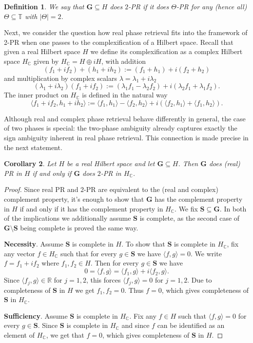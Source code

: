 \documentclass[reqno,a4paper,11pt]{amsart}
\numberwithin{equation}{section}
\newtheorem{definition}{Definition}[section]
\newtheorem{corollary}[definition]{Corollary}
\def\R{{\mathbb R}}
\def\T{{\mathbb T}}
\def\C{{\mathbb C}}
\newcommand\1{\mathds{1}}
\begin{document}
\begin{definition}\label{def:2PR}
    We say that $\mathbf{G}\subseteq H$ does $2$-PR if it does $\Theta$-PR for any (hence all) $\Theta\subseteq \T$ with $|\Theta|=2$.
\end{definition}

Next, we consider the question how real phase retrieval fits into the framework of 2-PR when one passes to the complexification of a Hilbert space. Recall that given a real Hilbert space $H$ we define its complexification as a complex Hilbert space $H_\C$ given by $H_\C = H\oplus iH$, with addition 
$$(f_1 + if_2) + (h_1 + ih_2) := (f_1+h_1) + i(f_2+h_2)$$
and multiplication by complex scalars $\lambda = \lambda_1+i\lambda_2$
$$(\lambda_1+i\lambda_2)(f_1+if_2):=(\lambda_1f_1 - \lambda_2f_2) + i(\lambda_2f_1 + \lambda_1f_2).$$
The inner product on $H_\C$ is defined in the natural way 
$$\langle f_1+if_2,h_1+ih_2\rangle:=\langle f_1,h_1\rangle - \langle f_2,h_2\rangle + i(\langle f_2,h_1\rangle + \langle f_1,h_2\rangle).$$

Although real and complex phase retrieval behave differently in general, the case of two phases is special: the two-phase ambiguity already captures exactly the sign ambiguity inherent in real phase retrieval. This connection is made precise in the next statement.

\begin{corollary}
    Let $H$ be a real Hilbert space and let $\mathbf{G} \subseteq H$. Then $\mathbf{G}$ does (real) PR in $H$ if and only if $\mathbf{G}$ does $2$-PR in $H_\C$.
\end{corollary}
\begin{proof}
    Since real PR and $2$-PR are equivalent to the (real and complex) complement property, it's enough to show that $\mathbf{G}$ has the complement property in $H$ if and only if it has the complement property in $H_\C$. We fix $\mathbf{S}\subseteq \mathbf{G}$. In both of the implications we additionally assume $\mathbf{S}$ is complete, as the second case of $\mathbf{G\setminus S}$ being complete is proved the same way.

    \textbf{Necessity}. Assume $\mathbf{S}$ is complete in $H$. To show that $\mathbf{S}$ is complete in $H_\C$, fix any vector $f\in H_\C$ such that for every $g\in \mathbf{S}$ we have $\langle f,g\rangle=0.$ We write $f=f_1+if_2$ where $f_1,f_2\in H$. Then for every $g\in \mathbf{S}$ we have
    $$0 = \langle f,g\rangle = \langle f_1, g\rangle + i\langle f_2,g\rangle.$$
    Since $\langle f_j,g\rangle \in \R$ for $j=1,2$, this forces $\langle f_j,g\rangle=0$ for $j=1,2$. Due to completeness of $\mathbf{S}$ in $H$ we get $f_1,f_2=0$. Thus $f=0$, which gives completeness of $\mathbf{S}$ in $H_\C$.

    \textbf{Sufficiency}. Assume $\mathbf{S}$ is complete in $H_\C$. Fix any $f\in H$ such that $\langle f,g\rangle=0$ for every $g\in \mathbf{S}$. Since $\mathbf{S}$ is complete in $H_\C$ and since $f$ can be identified as an element of $H_\C$, we get that $f=0$, which gives completeness of $\mathbf{S}$ in $H$.
\end{proof}
\end{document}
